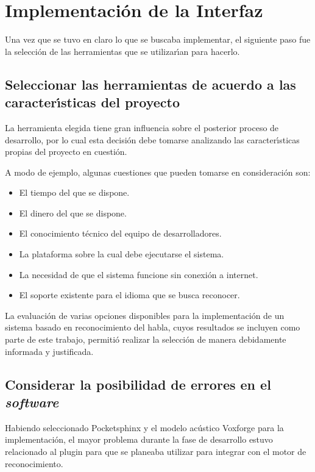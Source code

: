 \section{Implementaci\'on de la Interfaz}
\label{sec:implementacion-interfaz}

Una vez que se tuvo en claro lo que se buscaba implementar, el siguiente paso
fue la selecci\'on de las herramientas que se utilizar{\'\i}an para hacerlo. 

\subsection{Seleccionar las herramientas de acuerdo a las \mbox{caracter{\'\i}sticas} del proyecto}
La herramienta elegida tiene gran influencia sobre el posterior proceso de
desarrollo, por lo cual esta decisi\'on debe tomarse analizando las caracter{\'\i}sticas
propias del proyecto en cuesti\'on.

A modo de ejemplo, algunas cuestiones que pueden tomarse en consideraci\'on son:

\begin{itemize}
	\item El tiempo del que se dispone.
	\item El dinero del que se dispone.
	\item El conocimiento t\'ecnico del equipo de desarrolladores.
	\item La plataforma sobre la cual debe ejecutarse el sistema.
	\item La necesidad de que el sistema funcione sin conexi\'on a internet.
	\item El soporte existente para el idioma que se busca reconocer.
\end{itemize}

La evaluaci\'on de varias opciones disponibles para la implementaci\'on de un sistema
basado en reconocimiento del habla, cuyos resultados se incluyen como parte de este
trabajo, permiti\'o realizar la selecci\'on de manera debidamente informada y justificada.

\subsection{Considerar la posibilidad de errores en el \emph{software}}
Habiendo seleccionado Pocketsphinx y el modelo ac\'ustico Voxforge para
la implementaci\'on, el mayor problema durante la fase de desarrollo estuvo relacionado
al plugin para  que se planeaba utilizar para integrar 
con el motor de reconocimiento.

